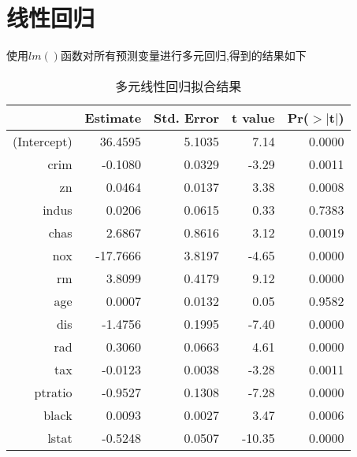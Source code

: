 \documentclass[cn]{elegantpaper}
\begin{document}
\section{线性回归}
使用$lm()$函数对所有预测变量进行多元回归,得到的结果如下
\begin{table}[ht]
    \centering
    \caption{多元线性回归拟合结果}
    \begin{tabular}{rrrrr}
      \hline
     & Estimate & Std. Error & t value & Pr($>$$|$t$|$) \\ 
      \hline
    (Intercept) & 36.4595 & 5.1035 & 7.14 & 0.0000 \\ 
      crim & -0.1080 & 0.0329 & -3.29 & 0.0011 \\ 
      zn & 0.0464 & 0.0137 & 3.38 & 0.0008 \\ 
      indus & 0.0206 & 0.0615 & 0.33 & 0.7383 \\ 
      chas & 2.6867 & 0.8616 & 3.12 & 0.0019 \\ 
      nox & -17.7666 & 3.8197 & -4.65 & 0.0000 \\ 
      rm & 3.8099 & 0.4179 & 9.12 & 0.0000 \\ 
      age & 0.0007 & 0.0132 & 0.05 & 0.9582 \\ 
      dis & -1.4756 & 0.1995 & -7.40 & 0.0000 \\ 
      rad & 0.3060 & 0.0663 & 4.61 & 0.0000 \\ 
      tax & -0.0123 & 0.0038 & -3.28 & 0.0011 \\ 
      ptratio & -0.9527 & 0.1308 & -7.28 & 0.0000 \\ 
      black & 0.0093 & 0.0027 & 3.47 & 0.0006 \\ 
      lstat & -0.5248 & 0.0507 & -10.35 & 0.0000 \\ 
       \hline
    \end{tabular}
\end{table}


\end{document}
